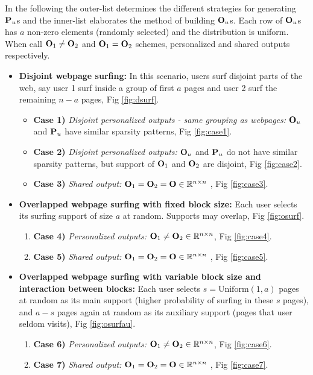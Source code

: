 	In the following the outer-list determines the different strategies for generating $\P_u$s and the inner-list elaborates the method of building $\O_u$s. 
	Each row of $\O_u$s has $a$ non-zero elements (randomly selected) and the distribution is uniform.
	When call $\O_1 \neq \O_2$ and $\O_1 = \O_2$ schemes, personalized and shared outputs respectively.
	
	\begin{itemize}
		\item {\bf Disjoint webpage surfing:}  In this scenario, users surf disjoint parts of the web, say user 1 surf inside a group of first $a$ pages and user 2 surf the remaining $n - a$ pages, Fig \ref{fig:dsurf}.
		\begin{itemize}
			\item[] {\bf Case 1)} \emph{Disjoint personalized outputs - same grouping as webpages:} $\O_u$ and $\P_u$ have similar sparsity patterns, Fig \ref{fig:case1}. 
			\item[] {\bf Case 2)} \emph{Disjoint personalized outputs:} $\O_u$ and $\P_u$ do not have similar sparsity patterns, but support of $\O_1$ and $\O_2$ are disjoint, Fig \ref{fig:case2}. 
			\item[] {\bf Case 3)} \emph{Shared output:} $\O_1 = \O_2 = \O \in \reals^{n \times n}$ , Fig \ref{fig:case3}.
		\end{itemize}
		\item {\bf Overlapped webpage surfing with fixed block size: }
		Each user selects its surfing support of size $a$ at random. 
		Supports may overlap, Fig \ref{fig:osurf}. 
		\begin{enumerate}
			\item[] {\bf Case 4)} \emph{Personalized outputs:} $\O_1 \neq \O_2 \in \reals^{n \times n}$, Fig \ref{fig:case4}. 
			\item[] {\bf Case 5)} \emph{Shared output:} $\O_1 = \O_2 = \O \in \reals^{n \times n}$ , Fig \ref{fig:case5}.
		\end{enumerate}
		\item {\bf Overlapped webpage surfing with variable block size and interaction between blocks: }
		Each user selects $s = \text{Uniform}(1, a)$ pages at random as its main support (higher probability of surfing in these $s$ pages), and $a-s$ pages again at random as its auxiliary support (pages that user seldom visits), Fig \ref{fig:osurfau}.
		\begin{enumerate}
			\item[] {\bf Case 6)} \emph{Personalized outputs:} $\O_1 \neq \O_2 \in \reals^{n \times n}$, Fig \ref{fig:case6}. 
			\item[] {\bf Case 7)} \emph{Shared output:} $\O_1 = \O_2 = \O \in \reals^{n \times n}$ , Fig \ref{fig:case7}.
		\end{enumerate}
	\end{itemize}
	
